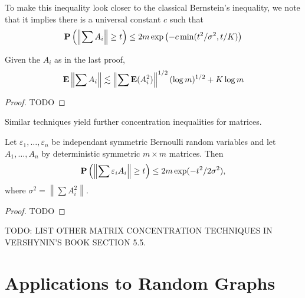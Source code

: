 \begin{remark}
    To make this inequality look closer to the classical Bernstein's inequality, we note that it implies there is a universal constant $c$ such that
    \[ \operatorname{\mathbf{P}} \left( \left\| \sum A_i \right\| \geq t \right) \leq 2m \exp \left( -c \min(t^2/\sigma^2, t/K) \right) \]
\end{remark}

\begin{corollary}
    Given the $A_i$ as in the last proof,
    \[ \operatorname{\mathbf{E}} \left\| \sum A_i \right\| \lesssim \left\| \sum \operatorname{\mathbf{E}}(A_i^2) \right\|^{1/2} (\log m)^{1/2} + K \log m \]
\end{corollary}
\begin{proof}
    TODO
\end{proof}

Similar techniques yield further concentration inequalities for matrices.

\begin{theorem}[Hoeffding]
    Let $\varepsilon_1, \dots, \varepsilon_n$ be independant symmetric Bernoulli random variables and let $A_1, \dots, A_n$ by deterministic symmetric $m \times m$ matrices. Then
    \[ \operatorname{\mathbf{P}} \left( \left\| \sum \varepsilon_i A_i \right\| \geq t \right) \leq 2m \exp(-t^2/2\sigma^2), \]
    where $\sigma^2 = \left\| \sum A_i^2 \right\|$.
\end{theorem}
\begin{proof}
    TODO
\end{proof}

TODO: LIST OTHER MATRIX CONCENTRATION TECHNIQUES IN VERSHYNIN'S BOOK SECTION 5.5.






\chapter{Applications to Random Graphs}

